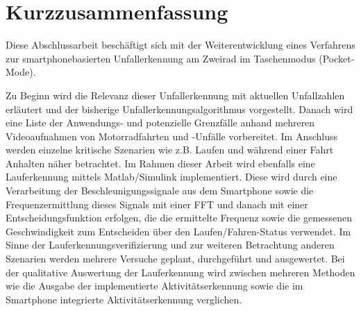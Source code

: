 \chapter*{Kurzzusammenfassung}
%
%
%
%
%
%
%
%
%
%
%
%

Diese Abschlussarbeit beschäftigt sich mit der Weiterentwicklung eines Verfahrens zur smartphonebasierten Unfallerkennung am Zweirad im Taschenmodus (Pocket-Mode). 

Zu Beginn wird die Relevanz dieser Unfallerkennung mit aktuellen Unfallzahlen erläutert und der bisherige Unfallerkennungsalgorithmus vorgestellt.
Danach wird eine Liste der Anwendungs- und potenzielle Grenzfälle anhand mehreren Videoaufnahmen von Motorradfahrten und -Unfälle vorbereitet. Im Anschluss werden einzelne kritische Szenarien wie z.B. Laufen und während einer Fahrt Anhalten näher betrachtet.
Im Rahmen dieser Arbeit wird ebenfalls eine Lauferkennung mittels Matlab/Simulink implementiert. Diese wird durch eine Verarbeitung der Beschleunigungssignale aus dem Smartphone sowie die Frequenzermittlung dieses Signals mit einer FFT und danach mit einer Entscheidungsfunktion erfolgen, die die ermittelte Frequenz sowie die gemessenen Geschwindigkeit zum Entscheiden über den Laufen/Fahren-Status verwendet.
Im Sinne der Lauferkennungsverifizierung und zur weiteren Betrachtung anderen Szenarien werden mehrere Versuche geplant, durchgeführt und ausgewertet.
Bei der qualitative Auswertung der Lauferkennung wird zwischen mehreren Methoden wie die Ausgabe der implementierte Aktivitätserkennung sowie die im Smartphone integrierte Aktivitätserkennung verglichen. 



